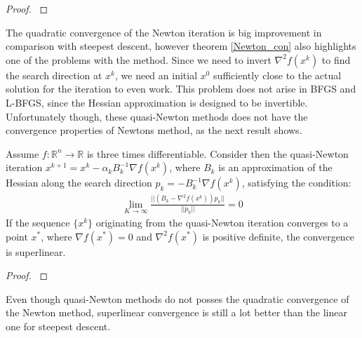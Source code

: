 \begin{proof}
\cite{nocedal2006numerical}
\end{proof}
The quadratic convergence of the Newton iteration is big improvement in comparison with steepest descent, however theorem \ref{Newton_con} also highlights one of the problems with the method. Since we need to invert $\nabla^2 f(x^k)$ to find the search direction at $x^k$, we need an initial $x^0$ sufficiently close to the actual solution for the iteration to even work. This problem does not arise in BFGS and L-BFGS, since the Hessian approximation is designed to be invertible. Unfortunately though, these quasi-Newton methods does not have the convergence properties of Newtons method, as the next result shows.
\begin{theorem}
Assume $f:\mathbb{R}^n\rightarrow\mathbb{R}$ is three times differentiable. Consider then the quasi-Newton iteration $x^{k+1}=x^k-\alpha_k B_k^{-1}\nabla f(x^k)$, where $B_k$ is an approximation of the Hessian along the search direction $p_k=-B_k^{-1}\nabla f(x^k)$, satisfying the condition:
\begin{align*}
\lim_{K\rightarrow\infty}\frac{||(B_k-\nabla^2f(x^k))p_k||}{||p_k||}=0
\end{align*}
If the sequence $\{x^k\}$ originating from the quasi-Newton iteration converges to a point $x^*$, where $\nabla f(x^*)=0$ and $\nabla^2 f(x^*)$ is positive definite, the convergence is superlinear. 
\end{theorem} 
\begin{proof}
\cite{nocedal2006numerical}
\end{proof}
Even though quasi-Newton methods do not posses the quadratic convergence of the Newton method, superlinear convergence is still a lot better than the linear one for steepest descent.
